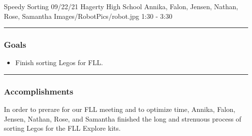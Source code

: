 \insertmeeting 
	{Speedy Sorting} 
	{09/22/21}
	{Hagerty High School}
	{Annika, Falon, Jensen, Nathan, Rose, Samantha}
	{Images/RobotPics/robot.jpg}
	{1:30 - 3:30}
	
\noindent\hfil\rule{\textwidth}{.4pt}\hfil
\subsubsection*{Goals}
\begin{itemize}
    \item Finish sorting Legos for FLL.

\end{itemize} 

\noindent\hfil\rule{\textwidth}{.4pt}\hfil

\subsubsection*{Accomplishments}
In order to prerare for our FLL meeting and to optimize time, Annika, Falon, Jensen, Nathan, Rose, and Samantha finished the long and strenuous process of sorting Legos for the FLL Explore kits. 
